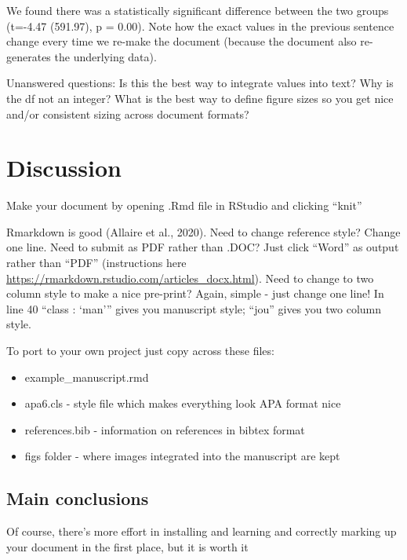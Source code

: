 \documentclass[
  english,
  ,jou,floatsintext]{apa6}
\providecommand{\tightlist}{%
  \setlength{\itemsep}{0pt}\setlength{\parskip}{0pt}}
\begin{document}
We found there was a statistically significant difference between the two groups (t=-4.47 (591.97), p = 0.00). Note how the exact values in the previous sentence change every time we re-make the document (because the document also re-generates the underlying data).

Unanswered questions: Is this the best way to integrate values into text? Why is the df not an integer? What is the best way to define figure sizes so you get nice and/or consistent sizing across document formats?

\hypertarget{discussion}{%
\section{Discussion}\label{discussion}}

Make your document by opening .Rmd file in RStudio and clicking \enquote{knit}

Rmarkdown is good (Allaire et al., 2020). Need to change reference style? Change one line. Need to submit as PDF rather than .DOC? Just click \enquote{Word} as output rather than \enquote{PDF} (instructions here \url{https://rmarkdown.rstudio.com/articles_docx.html}). Need to change to two column style to make a nice pre-print? Again, simple - just change one line! In line 40 \enquote{class : \enquote{man}} gives you manuscript style; \enquote{jou} gives you two column style.

To port to your own project just copy across these files:

\begin{itemize}
\tightlist
\item
  example\_manuscript.rmd
\item
  apa6.cls - style file which makes everything look APA format nice
\item
  references.bib - information on references in bibtex format
\item
  figs folder - where images integrated into the manuscript are kept
\end{itemize}

\hypertarget{main-conclusions}{%
\subsection{Main conclusions}\label{main-conclusions}}

Of course, there's more effort in installing and learning and correctly marking up your document in the first place, but it is worth it
\end{document}
